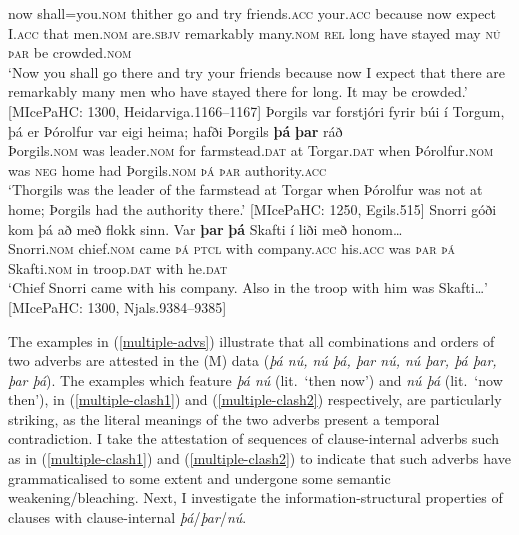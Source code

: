 \documentclass[output=paper,colorlinks,citecolor=brown]{langscibook}
\begin{document}
now shall=you.\textsc{nom} thither go and try friends.\textsc{acc} your.\textsc{acc} because now expect I.\textsc{acc} that men.\textsc{nom} are.\textsc{sbjv} remarkably many.\textsc{nom} \textsc{rel} long have stayed may \textsc{nú} \textsc{þar} be crowded.\textsc{nom}\\
\glt `Now you shall go there and try your friends because now I expect that there are remarkably many men who have stayed there for long. It may be crowded.' \hfill [MIcePaHC: 1300, Heidarviga.1166--1167]
\ex 
\gll Þorgils var forstjóri fyrir búi í Torgum, {þá er} Þórolfur var eigi heima; hafði Þorgils \textbf{þá} \textbf{þar} ráð\\
Þorgils.\textsc{nom} was leader.\textsc{nom} for farmstead.\textsc{dat} at Torgar.\textsc{dat} when Þórolfur.\textsc{nom} was \textsc{neg} home had Þorgils.\textsc{nom} \textsc{þá} \textsc{þar} authority.\textsc{acc}\\
\glt `Thorgils was the leader of the farmstead at Torgar when Þórolfur was not at home; Þorgils  had the authority there.' \hfill [MIcePaHC: 1250, Egils.515]
\ex
\gll Snorri góði kom þá að með flokk sinn. Var \textbf{þar} \textbf{þá} Skafti í liði með honom\dots\\
Snorri.\textsc{nom} chief.\textsc{nom} came \textsc{þá} \textsc{ptcl} with company.\textsc{acc} his.\textsc{acc} was \textsc{þar} \textsc{þá}  Skafti.\textsc{nom} in troop.\textsc{dat} with he.\textsc{dat}\\
\glt `Chief Snorri came with his company. Also in the troop with him was Skafti\dots' \hfill [MIcePaHC: 1300, Njals.9384--9385]
\z 
\z 

\noindent The examples in (\ref{multiple-advs}) illustrate that all combinations and orders of two adverbs are attested in the (M) data (\textit{þá nú, nú þá, þar nú, nú þar, þá þar, þar þá}). The examples which feature \textit{þá nú} (lit.~`then now') and \textit{nú þá} (lit.~`now then'), in (\ref{multiple-clash1}) and (\ref{multiple-clash2}) respectively, are particularly striking, as the literal meanings of the two adverbs present a temporal contradiction. I take the attestation of sequences of clause-internal adverbs such as in (\ref{multiple-clash1}) and (\ref{multiple-clash2}) to indicate that such adverbs have grammaticalised to some extent and undergone some semantic weakening/bleaching. Next, I investigate the information-structural properties of clauses with clause-internal \textit{þá}/\textit{þar}/\textit{nú}.
\end{document}
